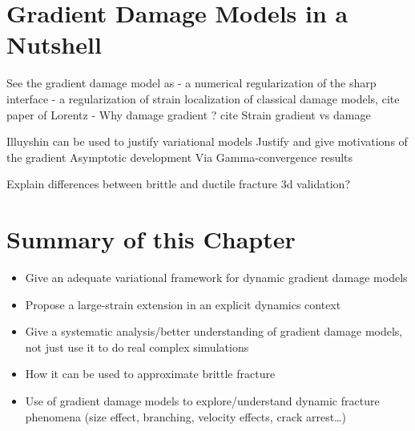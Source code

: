 \section{Gradient Damage Models in a Nutshell} \label{sec:graddamage}
See the gradient damage model as
- a numerical regularization of the sharp interface
- a regularization of strain localization of classical damage models, cite paper of Lorentz
- Why damage gradient ? cite Strain gradient vs damage

Illuyshin can be used to justify variational models
Justify and give motivations of the gradient
Asymptotic development
Via Gamma-convergence results

Explain differences between brittle and ductile fracture
3d validation?


\section{Summary of this Chapter} \label{sec:summarychap1}
\begin{itemize}
\item Give an adequate variational framework for dynamic gradient damage models
\item Propose a large-strain extension in an explicit dynamics  context
\item Give a systematic analysis/better understanding of gradient damage models, not just use it to do real complex simulations
\item How it can be used to approximate brittle fracture
\item Use of gradient damage models to explore/understand dynamic fracture phenomena (size effect, branching, velocity effects, crack arrest\ldots)
\end{itemize}